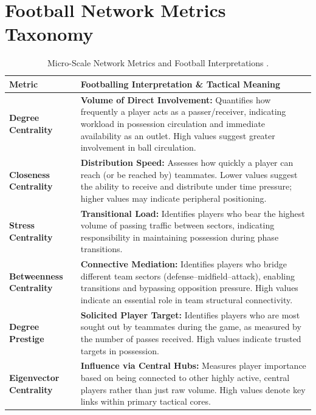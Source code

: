 \documentclass[12pt, a4paper]{article}
\begin{document}
\section{Football Network Metrics Taxonomy}
\label{app:network_metrics_taxonomy}

\begin{table}[htbp]
    \centering
    \small
    \caption{Micro-Scale Network Metrics and Football Interpretations \cite{gama2026stoch}.}
    \label{tab:gama_micro_metrics}
    \begin{tabularx}{\textwidth}{l X}
        \toprule
        \textbf{Metric} & \textbf{Footballing Interpretation \& Tactical Meaning} \\
        \midrule
        \textbf{Degree Centrality} & \textbf{Volume of Direct Involvement:} Quantifies how frequently a player acts as a passer/receiver, indicating workload in possession circulation and immediate availability as an outlet. High values suggest greater involvement in ball circulation. \\
        \addlinespace[3pt]
        \textbf{Closeness Centrality} & \textbf{Distribution Speed:} Assesses how quickly a player can reach (or be reached by) teammates. Lower values suggest the ability to receive and distribute under time pressure; higher values may indicate peripheral positioning. \\
        \addlinespace[3pt]
        \textbf{Stress Centrality} & \textbf{Transitional Load:} Identifies players who bear the highest volume of passing traffic between sectors, indicating responsibility in maintaining possession during phase transitions. \\
        \addlinespace[3pt]
        \textbf{Betweenness Centrality} & \textbf{Connective Mediation:} Identifies players who bridge different team sectors (defense--midfield--attack), enabling transitions and bypassing opposition pressure. High values indicate an essential role in team structural connectivity. \\
        \addlinespace[3pt]
        \textbf{Degree Prestige} & \textbf{Solicited Player Target:} Identifies players who are most sought out by teammates during the game, as measured by the number of passes received. High values indicate trusted targets in possession. \\
        \addlinespace[3pt]
        \textbf{Eigenvector Centrality} & \textbf{Influence via Central Hubs:} Measures player importance based on being connected to other highly active, central players rather than just raw volume. High values denote key links within primary tactical cores. \\

\end{tabularx}
\end{table}
\end{document}
